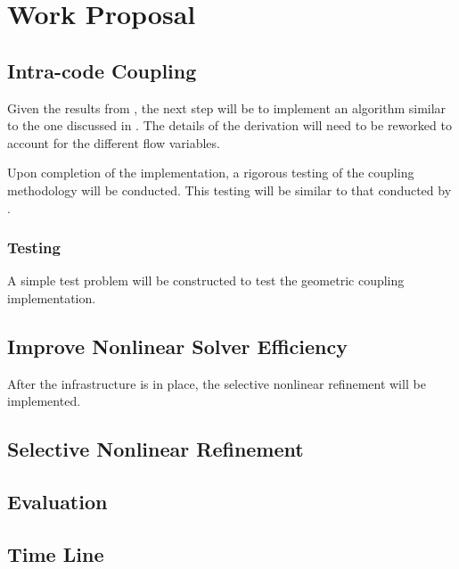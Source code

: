 \chapter{Work Proposal}
\label{chap:future}


\section{Intra-code Coupling}
\label{sect:future_intracode_coupling}

Given the results from , the next step will be to implement an algorithm similar to the one discussed in .
The details of the derivation will need to be reworked to account for the different flow variables.

Upon completion of the implementation, a rigorous testing of the coupling methodology will be conducted.
This testing will be similar to that conducted by \citet{Weaver2002}.

\subsection{Testing}
A simple test problem will be constructed to test the geometric coupling implementation.


\section{Improve Nonlinear Solver Efficiency}
\label{sect:future_nonlinear_solver}
After the infrastructure is in place, the selective nonlinear refinement will be implemented.

\section{Selective Nonlinear Refinement}
\label{sect:selective_nonlinear_refinement}


\section{Evaluation}
\label{sect:future_eval}


\section{Time Line}
\label{sect:time_line}






